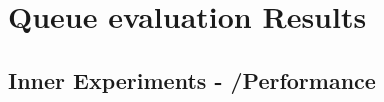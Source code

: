 \clearpage{}

\chapter{Queue evaluation Results}
\section{\label{sec:appendix-llic-performance}Inner Experiments - \LL/\IC Performance}

